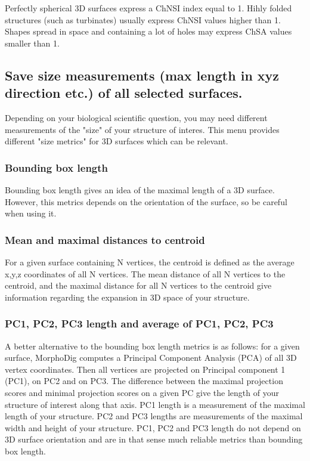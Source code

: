 \noindent Perfectly spherical 3D surfaces express a ChNSI index equal to 1. Hihly folded structures (such as turbinates) usually express ChNSI values higher than 1. Shapes spread in space and containing a lot of holes may express ChSA values smaller than 1.

\subsection{Save size measurements (max length in xyz direction etc.) of all selected surfaces.}
Depending on your biological scientific question, you may need different measurements of the "size" of your structure of interes. This menu provides different "size metrics" for 3D surfaces which can be relevant. \\
\subsubsection{Bounding box length}
Bounding box length gives an idea of the maximal length of a 3D surface. However, this metrics depends on the orientation of the surface, so be careful when using it.

\subsubsection{Mean and maximal distances to centroid}
For a given surface containing N vertices, the centroid is defined as the average x,y,z coordinates of all N vertices. The mean distance of all N vertices to the centroid, and the maximal distance for all N vertices to the centroid give information regarding the expansion in 3D space of your structure.
\subsubsection{PC1, PC2, PC3 length and average of PC1, PC2, PC3}
A better alternative to the bounding box length metrics is as follows: for a given surface, MorphoDig computes a Principal Component Analysis (PCA) of all 3D vertex coordinates. Then all vertices are projected on Principal component 1 (PC1), on PC2 and on PC3. The difference between the maximal projection scores and minimal projection scores on a given PC give the length of your structure of interest along that axis. PC1 length is a measurement of the maximal length of your structure. PC2 and PC3 lengths are measurements of the maximal width and height of your structure. PC1, PC2 and PC3 length do not depend on 3D surface orientation and are in that sense much reliable metrics than bounding box length. 

